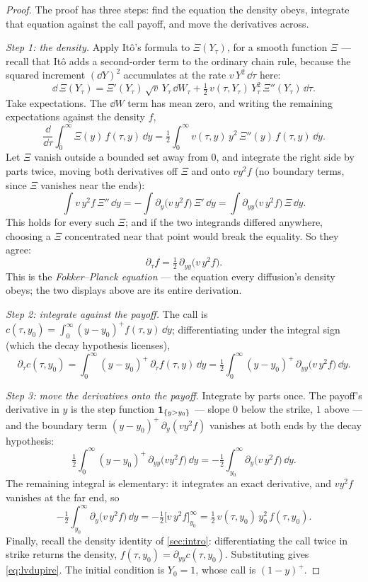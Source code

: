\begin{proof}
The proof has three steps: find the equation the density obeys,
integrate that equation against the call payoff, and move the
derivatives across.

\emph{Step 1: the density.}  Apply It\^o's formula to $\Xi(Y_\tau)$,
for a smooth function $\Xi$ --- recall that It\^o adds a second-order
term to the ordinary chain rule, because the squared increment
$(\dd Y)^2$ accumulates at the rate $v\,Y^{2}\,\dd\tau$ here:
\[
\dd\,\Xi(Y_\tau)
=\Xi'(Y_\tau)\,\sqrt{v}\,Y_\tau\,\dd W_\tau
+\tfrac12\,v(\tau,Y_\tau)\,Y_\tau^{2}\,\Xi''(Y_\tau)\,\dd\tau .
\]
Take expectations.  The $\dd W$ term has mean zero, and writing the
remaining expectations against the density $f$,
\[
\frac{\dd}{\dd\tau}\int_0^\infty \Xi(y)\,f(\tau,y)\,\dd y
=\tfrac12\int_0^\infty v(\tau,y)\,y^{2}\,\Xi''(y)\,f(\tau,y)\,\dd y .
\]
Let $\Xi$ vanish outside a bounded set away from $0$, and integrate
the right side by parts twice, moving both derivatives off $\Xi$
and onto $v y^{2}f$ (no boundary terms, since $\Xi$ vanishes near
the ends):
\[
\int v\,y^{2}f\,\Xi''\,\dd y
=-\int \partial_y\big(v\,y^{2}f\big)\,\Xi'\,\dd y
=\int \partial_{yy}\big(v\,y^{2}f\big)\,\Xi\,\dd y .
\]
This holds for every such $\Xi$; and if the two integrands differed
anywhere, choosing a $\Xi$ concentrated near that point would break
the equality.  So they agree:
\[
\partial_\tau f=\tfrac12\,\partial_{yy}\big(v\,y^{2}f\big).
\]
This is the \emph{Fokker--Planck equation} --- the equation every
diffusion's density obeys; the two displays above are its entire
derivation.

\emph{Step 2: integrate against the payoff.}  The call is
$c(\tau,y_0)=\int_0^\infty(y-y_0)^{+}f(\tau,y)\,\dd y$; differentiating
under the integral sign (which the decay hypothesis licenses),
\[
\partial_\tau c(\tau,y_0)
=\int_0^\infty (y-y_0)^{+}\,\partial_\tau f(\tau,y)\,\dd y
=\tfrac12\int_0^\infty (y-y_0)^{+}\,
  \partial_{yy}\big(v\,y^{2}f\big)\,\dd y .
\]

\emph{Step 3: move the derivatives onto the payoff.}  Integrate by
parts once.  The payoff's derivative in $y$ is the step function
$\mathbf{1}_{\{y>y_0\}}$ --- slope $0$ below the strike, $1$ above --- and the
boundary term $(y-y_0)^{+}\,\partial_y(vy^{2}f)$ vanishes at both ends
by the decay hypothesis:
\[
\tfrac12\int_0^\infty (y-y_0)^{+}\,\partial_{yy}\big(v y^{2}f\big)\,\dd y
=-\tfrac12\int_{y_0}^\infty \partial_y\big(v\,y^{2}f\big)\,\dd y .
\]
The remaining integral is elementary: it integrates an exact derivative,
and $v y^{2}f$ vanishes at the far end, so
\[
-\tfrac12\int_{y_0}^\infty \partial_y\big(v\,y^{2}f\big)\,\dd y
=-\tfrac12\Big[v\,y^{2}f\Big]_{y_0}^{\infty}
=\tfrac12\,v(\tau,y_0)\,y_0^{2}\,f(\tau,y_0).
\]
Finally, recall the density identity of \cref{sec:intro}:
differentiating the call twice in strike returns the density,
$f(\tau,y_0)=\partial_{yy}c(\tau,y_0)$.  Substituting gives
\eqref{eq:lvdupire}.  The initial condition is $Y_0=1$, whose call is
$(1-y)^{+}$.
\end{proof}

